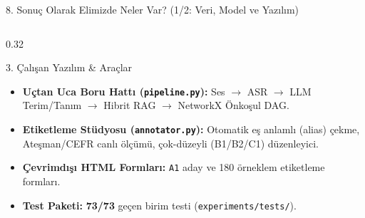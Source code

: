 \documentclass[aspectratio=169,10pt]{beamer}
\begin{document}
\begin{frame}{8. Sonuç Olarak Elimizde Neler Var? (1/2: Veri, Model ve Yazılım)}
\begin{columns}[T]
\begin{column}{0.32\textwidth}
\begin{block}{3. Çalışan Yazılım \& Araçlar}
\begin{itemize}
    \item \textbf{Uçtan Uca Boru Hattı (\texttt{pipeline.py}):} Ses $\to$ ASR $\to$ LLM Terim/Tanım $\to$ Hibrit RAG $\to$ NetworkX Önkoşul DAG.
    \item \textbf{Etiketleme Stüdyosu (\texttt{annotator.py}):} Otomatik eş anlamlı (alias) çekme, Ateşman/CEFR canlı ölçümü, çok-düzeyli (B1/B2/C1) düzenleyici.
    \item \textbf{Çevrimdışı HTML Formları:} \texttt{A1} aday ve 180 örneklem etiketleme formları.
    \item \textbf{Test Paketi:} \textbf{73/73} geçen birim testi (\texttt{experiments/tests/}).
\end{itemize}
\end{block}
\end{column}
\end{columns}
\end{frame}
\end{document}

